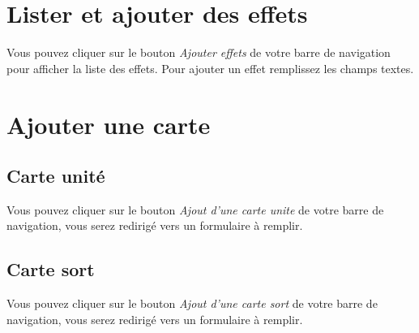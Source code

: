 \documentclass[a4paper,11pt]{report}
\begin{document}
	\section{Lister et ajouter des effets}
	Vous pouvez cliquer sur le bouton \textit{Ajouter effets} de votre barre de navigation pour afficher la liste des effets. Pour ajouter un effet remplissez les champs textes.

	\section{Ajouter une carte}
		\subsection{Carte unité}
	Vous pouvez cliquer sur le bouton \textit{Ajout d'une carte unite} de votre barre de navigation, vous serez redirigé vers un formulaire à remplir.
		
		\subsection{Carte sort}
	Vous pouvez cliquer sur le bouton \textit{Ajout d'une carte sort} de votre barre de navigation, vous serez redirigé vers un formulaire à remplir.


        
\end{document}
